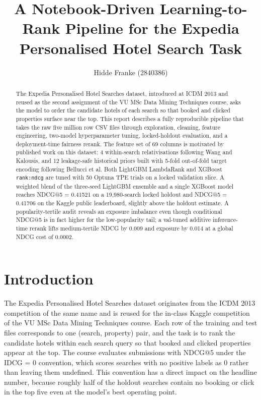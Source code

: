 \documentclass[runningheads]{llncs}
\begin{document}
\title{A Notebook-Driven Learning-to-Rank Pipeline for the Expedia Personalised Hotel Search Task}
\author{Hidde Franke (2840386)}

\maketitle

\begin{abstract}
The Expedia Personalised Hotel Searches dataset, introduced at ICDM 2013 and reused as the second assignment of the VU MSc Data Mining Techniques course, asks the model to order the candidate hotels of each search so that booked and clicked properties surface near the top. This report describes a fully reproducible pipeline that takes the raw five million row CSV files through exploration, cleaning, feature engineering, two-model hyperparameter tuning, locked-holdout evaluation, and a deployment-time fairness rerank. The feature set of 69 columns is motivated by published work on this dataset: 4 within-search relativisations following Wang and Kalousis, and 12 leakage-safe historical priors built with 5-fold out-of-fold target encoding following Bellucci et al. Both LightGBM LambdaRank and XGBoost \texttt{rank:ndcg} are tuned with 50 Optuna TPE trials on a locked validation slice. A weighted blend of the three-seed LightGBM ensemble and a single XGBoost model reaches NDCG@5 = 0.41521 on a 19{,}980-search locked holdout and NDCG@5 = 0.41706 on the Kaggle public leaderboard, slightly above the holdout estimate. A popularity-tertile audit reveals an exposure imbalance even though conditional NDCG@5 is in fact higher for the low-popularity tail; a val-tuned additive inference-time rerank lifts medium-tertile NDCG by 0.009 and exposure by 0.014 at a global NDCG cost of 0.0002.

\end{abstract}

\section{Introduction}

The Expedia Personalised Hotel Searches dataset originates from the ICDM 2013 competition of the same name and is reused for the in-class Kaggle competition of the VU MSc Data Mining Techniques course. Each row of the training and test files corresponds to one (search, property) pair, and the task is to rank the candidate hotels within each search query so that booked and clicked properties appear at the top. The course evaluates submissions with NDCG@5 under the IDCG = 0 convention, which scores searches with no positive labels as 0 rather than leaving them undefined. This convention has a direct impact on the headline number, because roughly half of the holdout searches contain no booking or click in the top five even at the model's best operating point.
\end{document}
